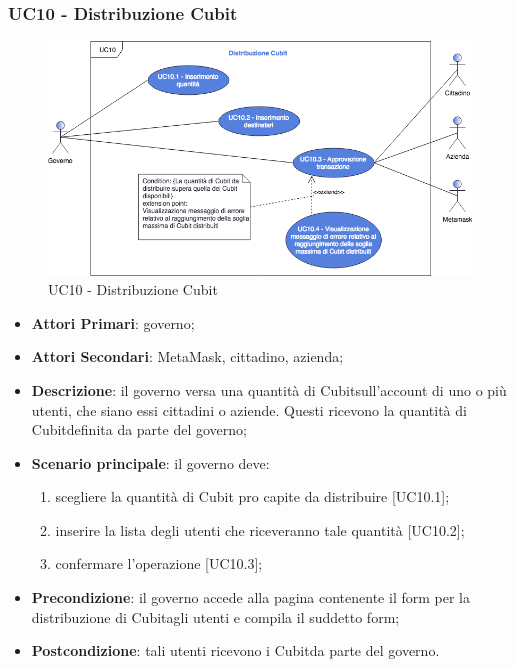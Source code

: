 \subsubsection{UC10 - Distribuzione Cubit}
\begin{figure}[h]
	\includegraphics[width=13.5cm]{res/images/UC10Distribuzione.png} %
	\centering
	\caption{UC10 - Distribuzione Cubit}
	
\end{figure}
\begin{itemize}
	\item \textbf{Attori Primari}: governo;
	\item \textbf{Attori Secondari}: MetaMask\glo, cittadino, azienda\glo;
	\item \textbf{Descrizione}: il governo versa una quantità di Cubit\glosp sull'account di uno o più  utenti, che siano essi cittadini o aziende. Questi ricevono la quantità di Cubit\glosp definita da parte del governo;
	\item \textbf{Scenario principale}: il governo deve:
	 \begin{enumerate}[label=\alph*.]
		\item scegliere la quantità di Cubit pro capite da distribuire [UC10.1];
		\item inserire la lista degli utenti che riceveranno tale quantità [UC10.2];
		\item confermare l'operazione [UC10.3];
	\end{enumerate}

	\item \textbf{Precondizione}: il governo accede alla pagina contenente il form per la distribuzione di Cubit\glosp agli utenti e compila il suddetto form;
	\item \textbf{Postcondizione}: tali utenti ricevono i Cubit\glosp da parte del governo.
\end{itemize}
